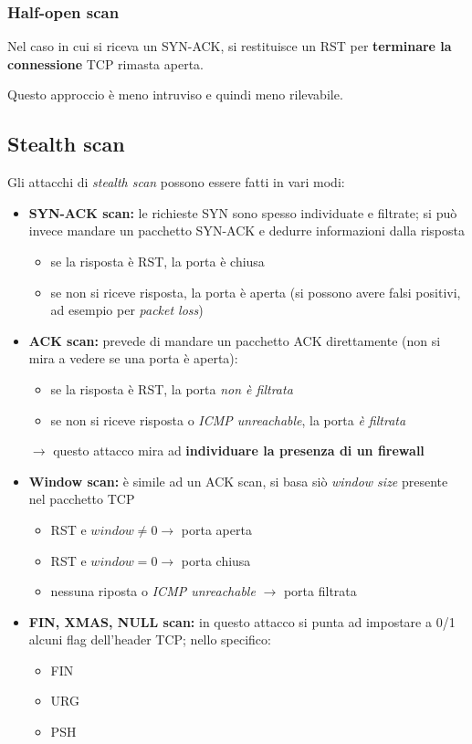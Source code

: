 \subsubsection{Half-open scan}
Nel caso in cui si riceva un SYN-ACK, si restituisce un RST per \textbf{terminare la connessione}
TCP rimasta aperta.

\noindent Questo approccio è meno intruviso e quindi meno rilevabile.

\subsection{Stealth scan}
Gli attacchi di \textit{stealth scan} possono essere fatti in vari modi:
\begin{itemize}
    \item \textbf{SYN-ACK scan:} le richieste SYN sono spesso individuate e filtrate; si può invece 
    mandare un pacchetto SYN-ACK e dedurre informazioni dalla risposta
    \begin{itemize}
        \item se la risposta è RST, la porta è chiusa 
        \item se non si riceve risposta, la porta è aperta (si possono avere falsi positivi, ad 
        esempio per \textit{packet loss})
    \end{itemize}
    \item \textbf{ACK scan:} prevede di mandare un pacchetto ACK direttamente (non si mira a vedere 
    se una porta è aperta):
    \begin{itemize}
        \item se la risposta è RST, la porta \textit{non è filtrata}
        \item se non si riceve risposta o \textit{ICMP unreachable}, la porta \textit{è filtrata}
    \end{itemize}

    \noindent $\rightarrow$ questo attacco mira ad \textbf{individuare la presenza di un firewall}
    \item \textbf{Window scan:} è simile ad un ACK scan, si basa siò \textit{window size} presente nel 
    pacchetto TCP 
    \begin{itemize}
        \item RST e $window \neq 0 \rightarrow$ porta aperta 
        \item RST e $window = 0 \rightarrow$ porta chiusa 
        \item nessuna riposta o \textit{ICMP unreachable} $\rightarrow$ porta filtrata
    \end{itemize}
    \item \textbf{FIN, XMAS, NULL scan:} in questo attacco si punta ad impostare a 0/1 alcuni flag 
    dell'header TCP; nello specifico:
    \begin{itemize}
        \item FIN
        \item URG 
        \item PSH
    \end{itemize}


\end{itemize}
